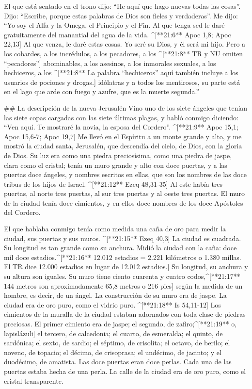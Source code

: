 \begin{paracols}{2}
 El que está sentado en el trono dijo: “He aquí que hago nuevas todas las cosas”. Dijo: “Escribe, porque estas palabras de Dios son fieles y verdaderas”.  Me dijo: “Yo soy el Alfa y la Omega, el Principio y el Fin. Al que tenga sed le daré gratuitamente del manantial del agua de la vida. ^[**21:6** Apoc 1,8; Apoc 22,13]  Al que venza, le daré estas cosas. Yo seré su Dios, y él será mi hijo.  Pero a los cobardes, a los incrédulos, a los pecadores, a los ^[**21:8** TR y NU omiten “pecadores”] abominables, a los asesinos, a los inmorales sexuales, a los hechiceros, a los ^[**21:8** La palabra “hechiceros” aquí también incluye a los usuarios de pociones y drogas.] idólatras y a todos los mentirosos, su parte está en el lago que arde con fuego y azufre, que es la muerte segunda.”

## La descripción de la nueva Jerusalén
 Vino uno de los siete ángeles que tenían las siete copas cargadas con las siete últimas plagas, y habló conmigo diciendo: “Ven aquí. Te mostraré la novia, la esposa del Cordero”. ^[**21:9** Apoc 15,1; Apoc 15,6-7; Apoc 19,7]  Me llevó en el Espíritu a un monte grande y alto, y me mostró la ciudad santa, Jerusalén, que descendía del cielo, de Dios,  con la gloria de Dios. Su luz era como una piedra preciosísima, como una piedra de jaspe, clara como el cristal;  tenía un muro grande y alto con doce puertas, y a las puertas doce ángeles, y nombres escritos en ellas, que son los nombres de las doce tribus de los hijos de Israel. ^[**21:12** Ezeq 48,31-35]  Al este había tres puertas, al norte tres puertas, al sur tres puertas y al oeste tres puertas.  El muro de la ciudad tenía doce cimientos, y en ellos doce nombres de los doce Apóstoles del Cordero.

 El que hablaba conmigo tenía como medida una caña de oro para medir la ciudad, sus puertas y sus muros. ^[**21:15** Ezeq 40,3]  La ciudad es cuadrada. Su longitud es tan grande como su anchura. Midió la ciudad con la caña: doce mil doce estadios.^[**21:16** 12.012 estadios = 2.221 kilómetros o 1.380 millas. El TR dice 12.000 estadios en lugar de 12.012 estadios.] Su longitud, su anchura y su altura son iguales.  Su muro tiene ciento cuarenta y cuatro codos,^[**21:17** 144 metros son aproximadamente 65,8 metros o 216 pies] según la medida de un hombre, es decir, de un ángel.  La construcción de su muro era de jaspe. La ciudad era de oro puro, como el vidrio puro. ^[**21:18** Is 54,11-12]  Los cimientos de la muralla de la ciudad estaban adornados con toda clase de piedras preciosas. El primer cimiento era de jaspe; el segundo, de zafiro;^[**21:19** o, lapislázuli] el tercero, de calcedonia; el cuarto, de esmeralda;  el quinto, de sardónica; el sexto, de sardio; el séptimo, de crisolita; el octavo, de berilo; el noveno, de topacio; el décimo, de crisoprasa; el undécimo, de jacinto; y el duodécimo, de amatista.  Las doce puertas eran doce perlas. Cada una de las puertas estaba hecha de una perla. La calle de la ciudad era de oro puro, como el cristal transparente.


\end{paracols}
